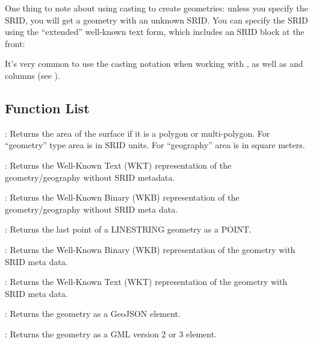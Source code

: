 \documentclass[a4paper,11pt,english]{sphinxmanual}
\begin{document}
One thing to note about using casting to create geometries: unless you specify the SRID, you will get a geometry with an unknown SRID. You can specify the SRID using the “extended” well-known text form, which includes an SRID block at the front:

\begin{sphinxVerbatim}[commandchars=\\\{\}]
 
\end{sphinxVerbatim}

It’s very common to use the casting notation when working with {\hyperref[\detokenize{glossary:term-wkt}]{}}, as well as  and  columns (see ).


\subsection{Function List}
\label{\detokenize{basic:id8}}
: Returns the area of the surface if it is a polygon or multi-polygon. For “geometry” type area is in SRID units. For “geography” area is in square meters.

: Returns the Well-Known Text (WKT) representation of the geometry/geography without SRID metadata.

: Returns the Well-Known Binary (WKB) representation of the geometry/geography without SRID meta data.

: Returns the last point of a LINESTRING geometry as a POINT.

: Returns the Well-Known Binary (WKB) representation of the geometry with SRID meta data.

: Returns the Well-Known Text (WKT) representation of the geometry with SRID meta data.

: Returns the geometry as a GeoJSON element.

: Returns the geometry as a GML version 2 or 3 element.
\end{document}
